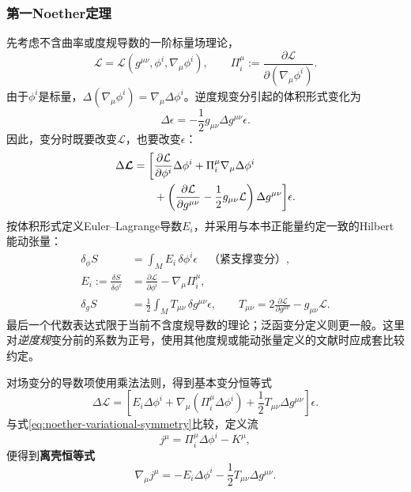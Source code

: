 \subsubsection{第一Noether定理}
先考虑不含曲率或度规导数的一阶标量场理论，
\begin{equation}
    \mathcal L=\mathcal L(g^{\mu\nu},\phi^i,\nabla_\mu\phi^i),
    \qquad \Pi_i^\mu:=\frac{\partial\mathcal L}{\partial(\nabla_\mu\phi^i)}.
\end{equation}
由于$\phi^i$是标量，$\Delta(\nabla_\mu\phi^i)=\nabla_\mu\Delta\phi^i$。逆度规变分引起的体积形式变化为
\begin{equation}
    \Delta\epsilon=-\frac12g_{\mu\nu}\Delta g^{\mu\nu}\epsilon.
\end{equation}
因此，变分时既要改变$\mathcal L$，也要改变$\epsilon$：
\begin{align}
    \Delta\boldsymbol{\mathcal L}
    =\bigg[&\frac{\partial\mathcal L}{\partial\phi^i}\Delta\phi^i
    +\Pi_i^\mu\nabla_\mu\Delta\phi^i\notag\\
    &+\left(\frac{\partial\mathcal L}{\partial g^{\mu\nu}}
    -\frac12g_{\mu\nu}\mathcal L\right)\Delta g^{\mu\nu}\bigg]\epsilon.
\end{align}
按体积形式定义Euler--Lagrange导数$E_i$，并采用与本书正能量约定一致的Hilbert能动张量：
\begin{align}
    \delta_\phi S&=\int_M E_i\,\delta\phi^i\epsilon
    \quad\text{（紧支撑变分）},\\
    E_i:=\frac{\delta S}{\delta\phi^i}
    &=\frac{\partial\mathcal L}{\partial\phi^i}-\nabla_\mu\Pi_i^\mu,\\
    \delta_g S&=\frac12\int_M T_{\mu\nu}\,\delta g^{\mu\nu}\epsilon,
    \qquad T_{\mu\nu}=2\frac{\partial\mathcal L}{\partial g^{\mu\nu}}-g_{\mu\nu}\mathcal L.
    \label{eq:noether-hilbert-t}
\end{align}
最后一个代数表达式限于当前不含度规导数的理论；泛函变分定义则更一般。这里对\emph{逆度规}变分前的系数为正号，使用其他度规或能动张量定义的文献时应成套比较约定。

对场变分的导数项使用乘法法则，得到基本变分恒等式
\begin{equation}
    \boxed{\Delta\boldsymbol{\mathcal L}
    =\left[E_i\Delta\phi^i
    +\nabla_\mu(\Pi_i^\mu\Delta\phi^i)
    +\frac12T_{\mu\nu}\Delta g^{\mu\nu}\right]\epsilon.}
    \label{eq:noether-variation}
\end{equation}
与式\eqref{eq:noether-variational-symmetry}比较，定义流
\begin{equation}
    \boxed{j^\mu=\Pi_i^\mu\Delta\phi^i-K^\mu,}
    \label{eq:noether-current}
\end{equation}
便得到\textbf{离壳恒等式}
\begin{equation}
    \boxed{\nabla_\mu j^\mu
    =-E_i\Delta\phi^i-\frac12T_{\mu\nu}\Delta g^{\mu\nu}.}
    \label{eq:noether-offshell}
\end{equation}

